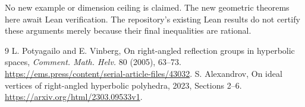 \documentclass[11pt]{article}
\begin{document}
No new example or dimension ceiling is claimed. The new geometric
theorems here await Lean verification. The repository's existing Lean
results do not certify these arguments merely because their final
inequalities are rational.

\begin{thebibliography}{9}
 L. Potyagailo and E. Vinberg,
On right-angled reflection groups in hyperbolic spaces,
\emph{Comment. Math. Helv.} 80 (2005), 63--73.
\url{https://ems.press/content/serial-article-files/43032}.
 S. Alexandrov,
On ideal vertices of right-angled hyperbolic polyhedra,
2023, Sections 2--6.
\url{https://arxiv.org/html/2303.09533v1}.
\end{thebibliography}
\end{document}
